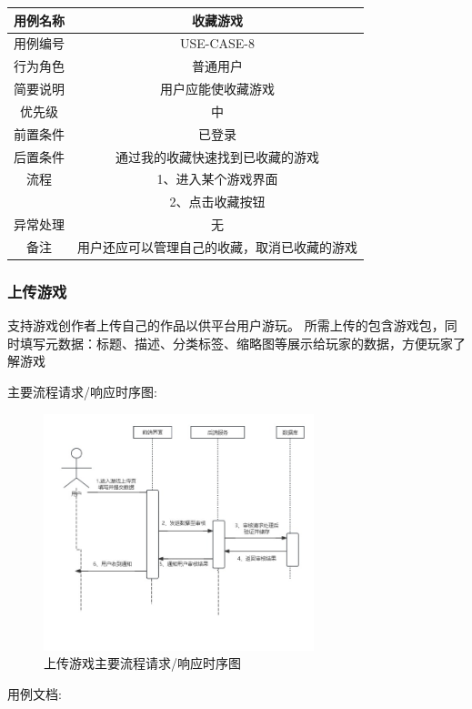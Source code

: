 \documentclass[12pt]{ctexart} %
\begin{document}
\begin{tabular}{|c|c|}
  \hline
  用例名称& 收藏游戏\\
  \hline
  用例编号 & USE-CASE-8\\
  \hline
  行为角色 & 普通用户\\
  \hline
  简要说明 & 用户应能使收藏游戏\\
  \hline
  优先级 & 中\\
  \hline
  前置条件 & 已登录\\
  \hline
  后置条件 & 通过我的收藏快速找到已收藏的游戏\\
  \hline
  流程 & 1、进入某个游戏界面\\
      &  2、点击收藏按钮\\
  \hline
  异常处理 & 无\\
  \hline
  备注 & 用户还应可以管理自己的收藏，取消已收藏的游戏\\
  \hline
\end{tabular}

\subsubsection{上传游戏}
支持游戏创作者上传自己的作品以供平台用户游玩。
所需上传的包含游戏包，同时填写元数据：标题、描述、分类标签、缩略图等展示给玩家的数据，方便玩家了解游戏

主要流程请求/响应时序图:
\begin{figure}[ht]
  \centering
  \includegraphics[width=0.7\textwidth]{yongli9.jpg}
  \caption{上传游戏主要流程请求/响应时序图}
\end{figure}
用例文档:
\end{document}
